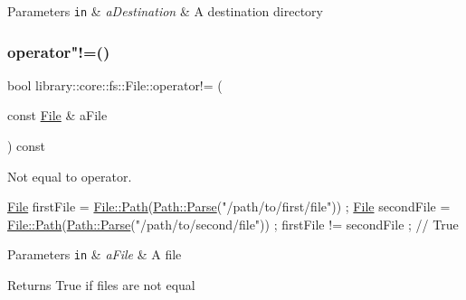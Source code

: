 \begin{DoxyParams}[1]{Parameters}
\mbox{\tt in}  & {\em a\+Destination} & A destination directory \\
\hline
\end{DoxyParams}
\mbox{\label{classlibrary_1_1core_1_1fs_1_1_file_a0354b6dd59250c07cd5a8b679dc36d95}} 
\subsubsection{\texorpdfstring{operator"!=()}{operator!=()}}
{\footnotesize\ttfamily bool library\+::core\+::fs\+::\+File\+::operator!= (\begin{DoxyParamCaption}\item[{const \hyperlink{classlibrary_1_1core_1_1fs_1_1_file}{File} \&}]{a\+File }\end{DoxyParamCaption}) const}



Not equal to operator. 


\begin{DoxyCode}
\hyperlink{classlibrary_1_1core_1_1fs_1_1_file_a6f3f0d79545ac9984c6f49432f0c6c39}{File} firstFile = \hyperlink{classlibrary_1_1core_1_1fs_1_1_file_a72d6cdf8bb7e299889c6149e2b8a6cc7}{File::Path}(\hyperlink{classlibrary_1_1core_1_1fs_1_1_path_a6ba644b6609507e724c217bf2020f5ae}{Path::Parse}(\textcolor{stringliteral}{"/path/to/first/file"})) ;
\hyperlink{classlibrary_1_1core_1_1fs_1_1_file_a6f3f0d79545ac9984c6f49432f0c6c39}{File} secondFile = \hyperlink{classlibrary_1_1core_1_1fs_1_1_file_a72d6cdf8bb7e299889c6149e2b8a6cc7}{File::Path}(\hyperlink{classlibrary_1_1core_1_1fs_1_1_path_a6ba644b6609507e724c217bf2020f5ae}{Path::Parse}(\textcolor{stringliteral}{"/path/to/second/file"})) ;
firstFile != secondFile ; \textcolor{comment}{// True}
\end{DoxyCode}



\begin{DoxyParams}[1]{Parameters}
\mbox{\tt in}  & {\em a\+File} & A file \\
\hline
\end{DoxyParams}
\begin{DoxyReturn}{Returns}
True if files are not equal 
\end{DoxyReturn}
\mbox{\label{classlibrary_1_1core_1_1fs_1_1_file_a8143d55e67cf2d6256c7653619a03909}} 
